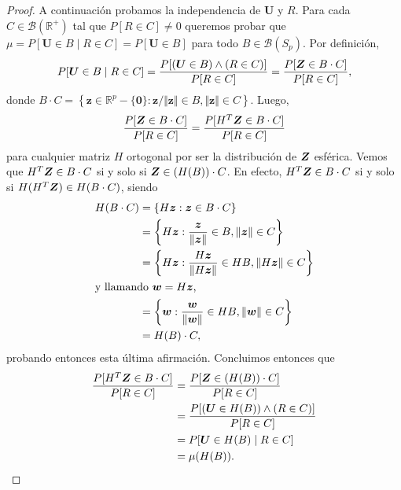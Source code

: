\begin{proof}
  A continuación probamos la independencia de $\boldsymbol U$ y $R$. Para cada $C \in \mathcal B(\mathbb R^+)$ tal que $P[R \in C] \neq 0$ queremos probar que $\mu = P[\boldsymbol U \in B \mid R \in C] = P[\boldsymbol U \in B]$ para todo $B \in \mathcal B(S_p)$.
  Por definición, \begin{align*}
    P[\boldsymbol U \in B \mid R \in C] 
    = \frac{P[(\boldsymbol U \in B) \land (R \in C)]}{P[R \in C]} 
    = \frac{P[\boldsymbol{Z} \in B \cdot C]}{P[R \in C]},
  \end{align*} 
  donde $B \cdot C = \left\{\boldsymbol z \in \mathbb R^p - \{\boldsymbol 0\} : \boldsymbol z/\Vert \boldsymbol z \Vert \in B, \Vert \boldsymbol z \Vert \in C\right\}$. 
  Luego, \begin{align*}
    \frac{P[\boldsymbol{Z} \in B \cdot C]}{P[R \in C]} = \frac{P[H^T\boldsymbol{Z} \in B \cdot C]}{P[R \in C]}
  \end{align*} para cualquier matriz $H$ ortogonal por ser la distribución de $\boldsymbol{Z}$ esférica. 
  Vemos que $H^T\boldsymbol{Z} \in B \cdot C$ si y solo si $\boldsymbol{Z} \in (H(B)) \cdot C$. En efecto, $H^T\boldsymbol{Z} \in B \cdot C$ si y solo si $H(H^T\boldsymbol{Z}) \in H(B \cdot C)$, siendo \begin{align*}
    H(B\cdot C) &= \left\{H \boldsymbol z : \boldsymbol z \in B \cdot C\right\}\\
      &= \left\{H \boldsymbol z : \frac{\boldsymbol z}{\Vert \boldsymbol z \Vert} \in B, \Vert \boldsymbol z \Vert \in C\right\} \\
      &= \left\{H \boldsymbol z : \frac{H \boldsymbol z}{\Vert H \boldsymbol z\Vert} \in HB, \Vert H\boldsymbol z\Vert \in C\right\}\\
      \shortintertext{y llamando $\boldsymbol w = H\boldsymbol z$,}
      &= \left\{\boldsymbol w : \frac{\boldsymbol w}{\Vert \boldsymbol w\Vert} \in HB, \Vert \boldsymbol w\Vert \in C\right\}\\
      &= H(B) \cdot C,
  \end{align*} probando entonces esta última afirmación.
  Concluimos entonces que \begin{align*}
    \frac{P[H^T\boldsymbol{Z} \in B \cdot C]}{P[R \in C]} &= \frac{P[\boldsymbol{Z} \in (H(B)) \cdot C]}{P[R \in C]}\\
      &= \frac{P[(\boldsymbol U \in H(B)) \land (R \in C)]}{P[R \in C]} \\
      &= P[\boldsymbol U \in H(B) \mid R \in C] \\
      &= \mu(H(B)).
  \end{align*}
\end{proof}


